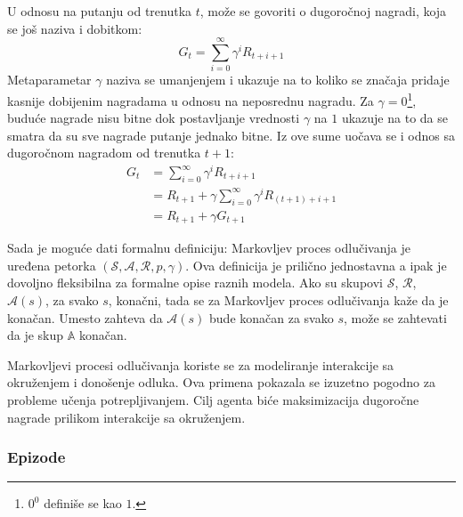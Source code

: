 U odnosu na putanju od trenutka $t$, može se govoriti o dugoročnoj nagradi, koja se još naziva i dobitkom:
\begin{equation}
\label{eq:dug_suma}
	G_t = \sum_{i=0}^{\infty} \gamma^iR_{t+i+1}
\end{equation}
Metaparametar $\gamma$ naziva se umanjenjem i ukazuje na to koliko se značaja pridaje kasnije dobijenim nagradama u odnosu na neposrednu nagradu. Za $\gamma = 0$\footnote{$0^0$ definiše se kao $1$.}, buduće nagrade nisu bitne dok postavljanje vrednosti $\gamma$ na $1$ ukazuje na to da se smatra da su sve nagrade putanje jednako bitne. Iz ove sume uočava se i odnos sa dugoročnom nagradom od trenutka $t+1$:
\begin{equation}
	\begin{aligned}
		G_t &= \sum_{i=0}^{\infty} \gamma^iR_{t+i+1} \\
        	&= R_{t+1} + \gamma\sum_{i=0}^{\infty} \gamma^iR_{(t+1)+i+1} \\
        	&=R_{t+1} + \gamma G_{t+1}
	\end{aligned}
\end{equation}
\par 
Sada je moguće dati formalnu definiciju: Markovljev proces odlučivanja je uređena petorka $(\mathcal{S}, \mathcal{A}, \mathcal{R}, p, \gamma)$. Ova definicija je prilično jednostavna a ipak je dovoljno fleksibilna za formalne opise raznih modela. Ako su skupovi $\mathcal{S}$, $\mathcal{R}$, $\mathcal{A}(s)$, za svako $s$, konačni, tada se za Markovljev proces odlučivanja kaže da je konačan. Umesto zahteva da $\mathcal{A}(s)$ bude konačan za svako $s$, može se zahtevati da je skup $\mathbb{A}$ konačan.
\par 
Markovljevi procesi odlučivanja koriste se za modeliranje interakcije sa okruženjem i donošenje odluka. Ova primena pokazala se izuzetno pogodno za probleme učenja potrepljivanjem. Cilj agenta biće maksimizacija dugoročne nagrade prilikom interakcije sa okruženjem.


\subsubsection{Epizode}


